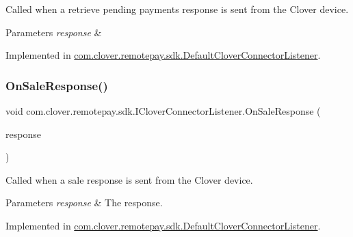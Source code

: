 Called when a retrieve pending payments response is sent from the Clover device. 


\begin{DoxyParams}{Parameters}
{\em response} & \\
\hline
\end{DoxyParams}


Implemented in \hyperlink{classcom_1_1clover_1_1remotepay_1_1sdk_1_1_default_clover_connector_listener_afb505c42e77209a31ce61911641f40cf}{com.\+clover.\+remotepay.\+sdk.\+Default\+Clover\+Connector\+Listener}.

\mbox{\label{interfacecom_1_1clover_1_1remotepay_1_1sdk_1_1_i_clover_connector_listener_a7a3aefe10180145d42d02a6a391b0113}} 
\subsubsection{\texorpdfstring{On\+Sale\+Response()}{OnSaleResponse()}}
{\footnotesize\ttfamily void com.\+clover.\+remotepay.\+sdk.\+I\+Clover\+Connector\+Listener.\+On\+Sale\+Response (\begin{DoxyParamCaption}\item[{\hyperlink{classcom_1_1clover_1_1remotepay_1_1sdk_1_1_sale_response}{Sale\+Response}}]{response }\end{DoxyParamCaption})}



Called when a sale response is sent from the Clover device. 


\begin{DoxyParams}{Parameters}
{\em response} & The response.\\
\hline
\end{DoxyParams}


Implemented in \hyperlink{classcom_1_1clover_1_1remotepay_1_1sdk_1_1_default_clover_connector_listener_a1a562a3f2e2f786ada3beeeec083fe83}{com.\+clover.\+remotepay.\+sdk.\+Default\+Clover\+Connector\+Listener}.

\mbox{\label{interfacecom_1_1clover_1_1remotepay_1_1sdk_1_1_i_clover_connector_listener_a39348a8d97a69efbbdf03e3ccbdced7d}} 
